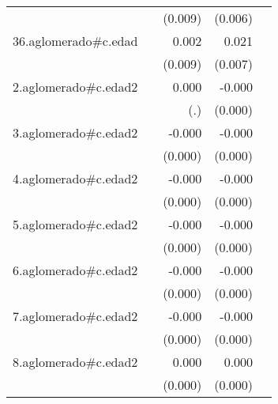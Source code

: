 {\begin{longtable}{l*{4}{D{.}{.}{-1}}}
            &                     &     (0.009)         &     (0.006)         &                     \\
\addlinespace
36.aglomerado#c.edad&                     &       0.002         &       0.021\sym{**} &                     \\
            &                     &     (0.009)         &     (0.007)         &                     \\
\addlinespace
2.aglomerado#c.edad2&                     &       0.000         &      -0.000         &                     \\
            &                     &         (.)         &     (0.000)         &                     \\
\addlinespace
3.aglomerado#c.edad2&                     &      -0.000         &      -0.000\sym{***}&                     \\
            &                     &     (0.000)         &     (0.000)         &                     \\
\addlinespace
4.aglomerado#c.edad2&                     &      -0.000         &      -0.000\sym{***}&                     \\
            &                     &     (0.000)         &     (0.000)         &                     \\
\addlinespace
5.aglomerado#c.edad2&                     &      -0.000         &      -0.000         &                     \\
            &                     &     (0.000)         &     (0.000)         &                     \\
\addlinespace
6.aglomerado#c.edad2&                     &      -0.000         &      -0.000\sym{*}  &                     \\
            &                     &     (0.000)         &     (0.000)         &                     \\
\addlinespace
7.aglomerado#c.edad2&                     &      -0.000         &      -0.000\sym{*}  &                     \\
            &                     &     (0.000)         &     (0.000)         &                     \\
\addlinespace
8.aglomerado#c.edad2&                     &       0.000\sym{*}  &       0.000         &                     \\
            &                     &     (0.000)         &     (0.000)         &                     \\

\end{longtable}}
